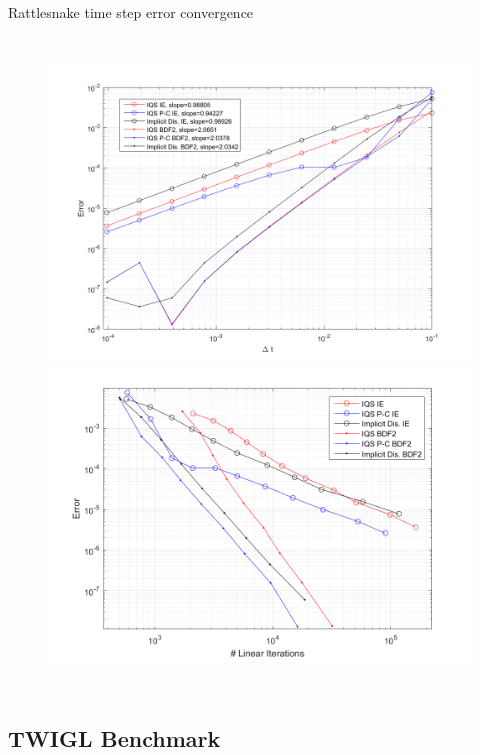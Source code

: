 \documentclass[8pt,xcolor=dvipnames]{beamer}
\begin{document}
\begin{frame}{Rattlesnake time step error convergence}

\begin{columns}
\column{\dimexpr\paperwidth-10pt}
\begin{figure}
\includegraphics[width=0.5\linewidth]{figures/1D_conv_Rat.png}
\includegraphics[width=0.5\linewidth]{figures/1D_conv_lin.png}
\end{figure}
\end{columns}

\end{frame}

\subsection{TWIGL Benchmark}
\end{document}
